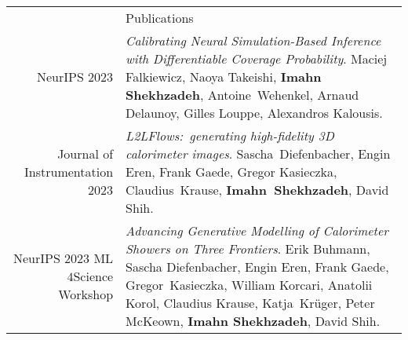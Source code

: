 \documentclass[11pt, a4paper]{article}
\newcommand{\headingfont}{\Large\color{OliveGreen}}
\newenvironment{SectionTable}[1]{
	\renewcommand*{\arraystretch}{1.7}
	\setlength{\tabcolsep}{10pt}
	\begin{longtable}{Rp{5.2in}} & #1 \\}
	{\end{longtable}\vspace{-.3cm}}
\begin{document}
	\begin{SectionTable}{\headingfont Publications} 
        NeurIPS 2023 & \textit{Calibrating Neural Simulation-Based Inference with Differentiable Coverage Probability}. 
        Maciej Falkiewicz, Naoya Takeishi, \textbf{Imahn Shekhzadeh}, \mbox{Antoine Wehenkel}, Arnaud Delaunoy, Gilles Louppe, 
        Alexandros Kalousis. \\

        Journal of \mbox{Instrumentation} 2023 & \textit{L2LFlows:~generating high-fidelity 3D calorimeter images}.
        \mbox{Sascha Diefenbacher}, Engin Eren, Frank Gaede, Gregor Kasieczka, \mbox{Claudius Krause}, \mbox{\textbf{Imahn Shekhzadeh}}, David Shih. \\

        NeurIPS 2023 ML$4$Science Workshop & \textit{Advancing Generative Modelling of Calorimeter Showers on Three Frontiers}.
        Erik Buhmann, Sascha Diefenbacher, Engin Eren, Frank Gaede, \mbox{Gregor Kasieczka}, William Korcari, Anatolii Korol, 
        Claudius Krause, \mbox{Katja Krüger}, Peter McKeown, \textbf{Imahn Shekhzadeh}, David Shih. \\[18pt]
        
	\end{SectionTable}
	
	\newpage 
\end{document}
